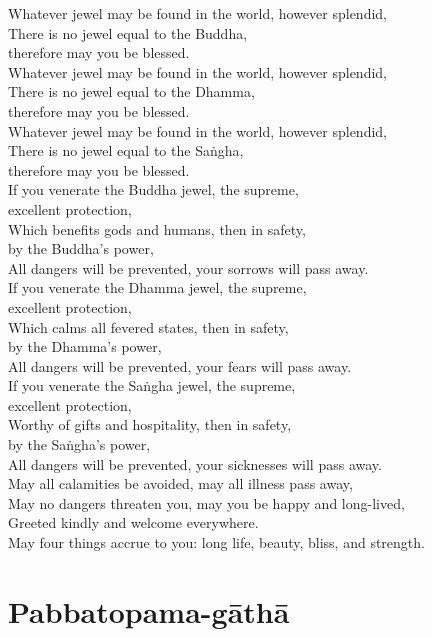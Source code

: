 Whatever jewel may be found in the world, however splendid,\\
There is no jewel equal to the Buddha,\\\vin therefore may you be blessed.\\
Whatever jewel may be found in the world, however splendid,\\
There is no jewel equal to the Dhamma,\\\vin therefore may you be blessed.\\
Whatever jewel may be found in the world, however splendid,\\
There is no jewel equal to the Saṅgha,\\\vin therefore may you be blessed.\\
If you venerate the Buddha jewel, the supreme,\\\vin excellent protection,\\
Which benefits gods and humans, then in safety,\\\vin by the Buddha's power,\\
All dangers will be prevented, your sorrows will pass away.\\
If you venerate the Dhamma jewel, the supreme,\\\vin excellent protection,\\
Which calms all fevered states, then in safety,\\\vin by the Dhamma's power,\\
All dangers will be prevented, your fears will pass away.\\
If you venerate the Saṅgha jewel, the supreme,\\\vin excellent protection,\\
Worthy of gifts and hospitality, then in safety,\\\vin by the Saṅgha's power,\\
All dangers will be prevented, your sicknesses will pass away.\\
May all calamities be avoided, may all illness pass away,\\
May no dangers threaten you, may you be happy and long-lived,\\
Greeted kindly and welcome everywhere.\\
May four things accrue to you: long life, beauty, bliss, and strength.

\section{Pabbatopama-gāthā}

